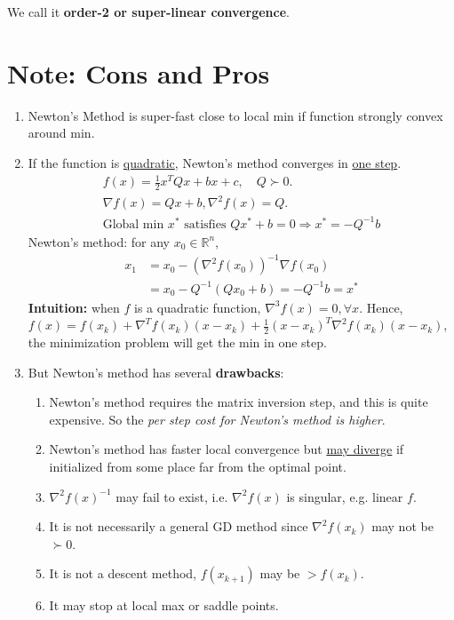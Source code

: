 \documentclass[11pt]{elegantbook}
\begin{document}
We call it \textbf{order-2 or super-linear convergence}.

\section{Note: Cons and Pros}
\begin{enumerate}[$\bullet$]
    \item Newton's Method is super-fast close to local min if function strongly convex around min.
    \item If the function is \underline{quadratic}, Newton's method converges in \underline{one step}.
    \begin{equation}
        \begin{aligned}
            f(x)=\frac{1}{2}x^TQx+bx+c,\quad Q\succ 0.\\
            \nabla f(x)=Qx+b,\nabla^2 f(x)=Q.\\
            \text{Global min $x^*$ satisfies } Qx^*+b=0 \Rightarrow	x^*=-Q^{-1}b
        \end{aligned}
        \nonumber
    \end{equation}
    Newton's method: for any $x_0\in \mathbb{R}^n$,
    \begin{equation}
        \begin{aligned}
            x_1&=x_0-(\nabla^2 f(x_0))^{-1}\nabla f(x_0)\\
            &=x_0-Q^{-1}(Qx_0+b)=-Q^{-1}b=x^*
        \end{aligned}
        \nonumber
    \end{equation}
    \textbf{Intuition:} when $f$ is a quadratic function, $\nabla^3 f(x)=0, \forall x$. Hence, $f(x)= f(x_k)+\nabla^T f(x_k)(x-x_k)+\frac{1}{2}(x-x_k)^T \nabla^2 f(x_k) (x-x_k)$, the minimization problem will get the min in one step.
    \item But Newton's method has several \textbf{drawbacks}:
    \begin{enumerate}[(1)]
        \item Newton’s method requires the matrix inversion step, and this is quite expensive. So the \textit{per step cost for Newton’s method is higher}.
        \item Newton’s method has faster local convergence but \underline{may diverge} if initialized from some place far from the optimal point.
        \item $\nabla^2 f(x)^{-1}$ may fail to exist, i.e. $\nabla^2 f(x)$ is singular, e.g. linear $f$.
        \item It is not necessarily a general GD method since $\nabla^2 f(x_k)$ may not be $\succ 0$.
        \item It is not a descent method, $f(x_{k+1})$ may be $> f(x_k)$.
        \item It may stop at local max or saddle points.
    \end{enumerate}
\end{enumerate}
\end{document}
